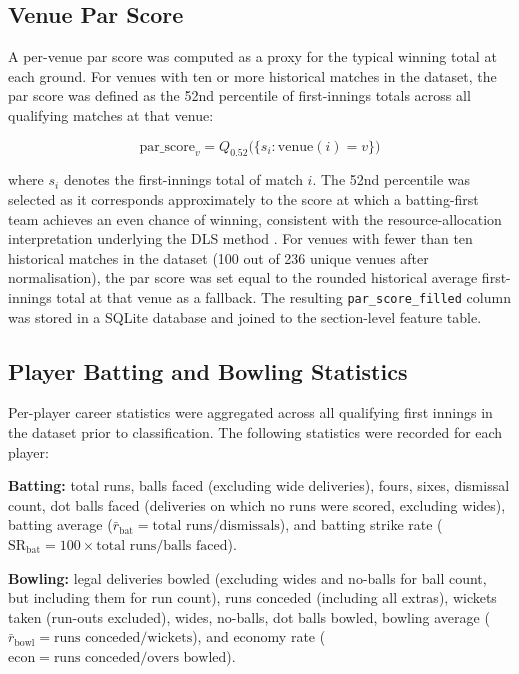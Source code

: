 \subsection{Venue Par Score}

A per-venue par score was computed as a proxy for the typical winning total at each ground. For venues with ten or more historical matches in the dataset, the par score was defined as the 52nd percentile of first-innings totals across all qualifying matches at that venue:

\begin{equation}
    \text{par\_score}_{v} = Q_{0.52}\bigl(\{s_i : \text{venue}(i) = v\}\bigr)
\end{equation}

where $s_i$ denotes the first-innings total of match $i$. The 52nd percentile was selected as it corresponds approximately to the score at which a batting-first team achieves an even chance of winning, consistent with the resource-allocation interpretation underlying the DLS method \cite{duckworth1998fair}. For venues with fewer than ten historical matches in the dataset (100 out of 236 unique venues after normalisation), the par score was set equal to the rounded historical average first-innings total at that venue as a fallback. The resulting \texttt{par\_score\_filled} column was stored in a SQLite database and joined to the section-level feature table.

\subsection{Player Batting and Bowling Statistics}

Per-player career statistics were aggregated across all qualifying first innings in the dataset prior to classification. The following statistics were recorded for each player:

\textbf{Batting:} total runs, balls faced (excluding wide deliveries), fours, sixes, dismissal count, dot balls faced (deliveries on which no runs were scored, excluding wides), batting average ($\bar{r}_\text{bat} = \text{total runs} / \text{dismissals}$), and batting strike rate ($\text{SR}_\text{bat} = 100 \times \text{total runs} / \text{balls faced}$).

\textbf{Bowling:} legal deliveries bowled (excluding wides and no-balls for ball count, but including them for run count), runs conceded (including all extras), wickets taken (run-outs excluded), wides, no-balls, dot balls bowled, bowling average ($\bar{r}_\text{bowl} = \text{runs conceded} / \text{wickets}$), and economy rate ($\text{econ} = \text{runs conceded} / \text{overs bowled}$).

